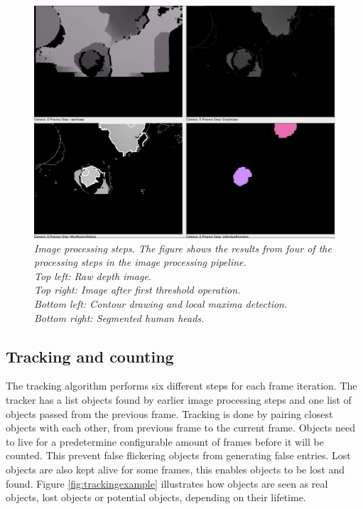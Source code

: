 \begin{figure}[htb]
	\centering
	\includegraphics[width=\linewidth]{images/image_processing_steps.png}
	\caption[Image processing steps]{\textit{Image processing steps. The figure shows the results from four of the processing steps in the image processing pipeline.\\
		Top left: Raw depth image.\\ 
		Top right: Image after first threshold operation.\\ 
		Bottom left: Contour drawing and local maxima detection.\\ 
		Bottom right: Segmented human heads.}}
	\label{fig:image_processing_steps}  %
\end{figure}

\newpage
\subsection{Tracking and counting}
The tracking algorithm performs six different steps for each frame iteration. The tracker has a list objects found by earlier image processing steps and one list of objects passed from the previous frame. Tracking is done by pairing closest objects with each other, from previous frame to the current frame. Objects need to live for a predetermine configurable amount of frames before it will be counted. This prevent false flickering objects from generating false entries. Lost objects are also kept alive for some frames, this enables objects to be lost and found. Figure \ref{fig:trackingexample} illustrates how objects are seen as real objects, lost objects or potential objects, depending on their lifetime. 

